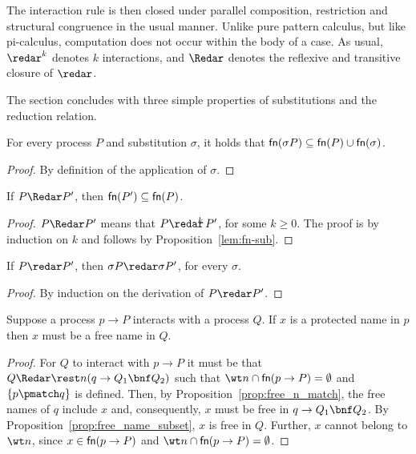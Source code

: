 \documentclass{LMCS}
\begin{document}
The interaction rule is then closed under parallel composition,
restriction and structural congruence in the usual manner. Unlike
pure pattern calculus, but like pi-calculus, computation does not occur within the body of a
case. As usual, $\redar^k$ denotes $k$ interactions, and $\Redar$ denotes the reflexive and transitive closure
of $\redar$.

The section concludes with three simple properties of substitutions and the reduction relation.

\begin{prop}
\label{lem:fn-sub}
For every process $P$ and substitution $\sigma$, it holds that ${\sf
  fn}(\sigma P)\subseteq {\sf fn}(P)\cup{\sf fn}(\sigma)$.
\end{prop}
\begin{proof}
By definition of the application of $\sigma$.
\end{proof}

\begin{prop}
\label{prop:free_name_subset}
If $P\Redar P'$, then ${\sf fn}(P')\subseteq {\sf fn}(P)$.
\end{prop}
\begin{proof}
$P\Redar P'$ means that $P\redar\!\!\!^k\, P'$, for some $k \geq 0$. The proof is by induction on $k$
and follows by Proposition~\ref{lem:fn-sub}.
\end{proof}

\begin{prop}
\label{red:renaming}
If $P \redar P'$, then $\sigma P \redar \sigma P'$, for every $\sigma$.
\end{prop}
\begin{proof}
By induction on the derivation of  $P \redar P'$.
\end{proof}

\begin{prop}
\label{prop:free_n_match_proc}
Suppose a process $p\to P$ interacts with a process $Q$. If $x$ is a protected
name in $p$ then $x$ must be a free name in $Q$.
\end{prop}
\begin{proof}
  For $Q$ to interact with $p\to P$ it must be that $Q\Redar \rest n
  (q\to Q_1\bnf Q_2)$ such that $\wt n \cap {\sf fn}(p \to P) =
  \emptyset$ and $\{p\pmatch q\}$ is defined. Then, by
  Proposition~\ref{prop:free_n_match}, the free names of $q$ include
  $x$ and, consequently, $x$ must be free in $q\to Q_1\bnf Q_2$.  By
  Proposition~\ref{prop:free_name_subset}, $x$ is free in $Q$. Further,
  $x$ cannot belong to $\wt n$, since $x \in {\sf fn}(p \to P)$ and
  $\wt n \cap {\sf fn}(p \to P) = \emptyset$.
\end{proof}
\end{document}
